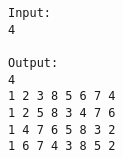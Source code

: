 \begin{verbatim}
Input:
4

Output:
4
1 2 3 8 5 6 7 4
1 2 5 8 3 4 7 6
1 4 7 6 5 8 3 2
1 6 7 4 3 8 5 2

\end{verbatim}